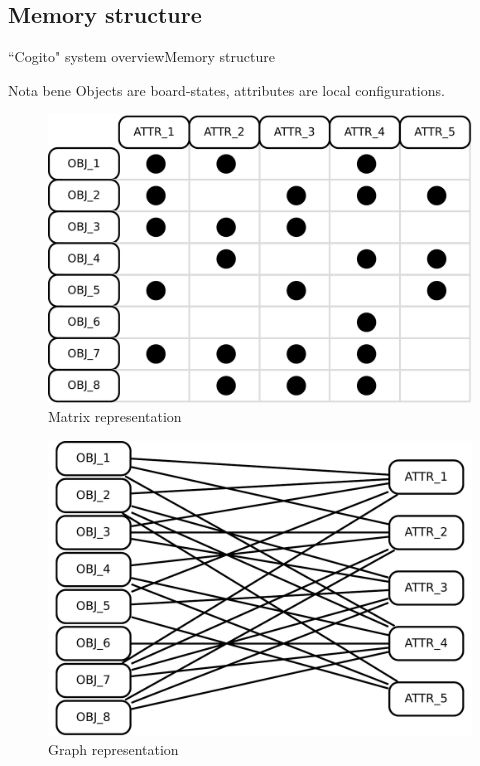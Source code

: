 \subsection{Memory structure}
\begin{frame}{``Cogito" system overview}{Memory structure}

\begin{block}{Nota bene}
Objects are board-states, attributes are local configurations.
\end{block}

\begin{figure}[ht]
  \begin{minipage}[t]{0.45\linewidth}
    \vspace{0pt}
    \centering
    \includegraphics[width=\textwidth]{img/cogito/context_matrix}
    \\ Matrix representation
  \end{minipage}
  \hfill
  \begin{minipage}[t]{0.45\textwidth}
    \vspace{0pt}
    \centering
    \includegraphics[width=\textwidth]{img/cogito/context_graph}
    \\ Graph representation
  \end{minipage}
\end{figure}

\end{frame}
